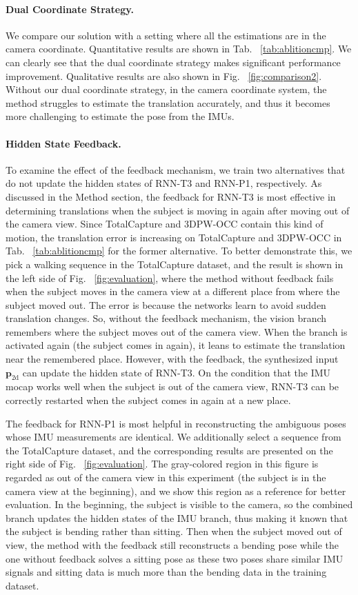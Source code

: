\documentclass[sigconf,nonacm=true]{acmart}
\begin{document}
\paragraph{Dual Coordinate Strategy.}
We compare our solution with a setting where all the estimations are in the camera coordinate.
Quantitative results are shown in Tab. ~\ref{tab:ablitioncmp}.
We can clearly see that the dual coordinate strategy makes significant performance improvement.
Qualitative results are also shown in Fig. ~\ref{fig:comparison2}.
Without our dual coordinate strategy, in the camera coordinate system, the method struggles to estimate the translation accurately, and thus it becomes more challenging to estimate the pose from the IMUs.  
\paragraph{Hidden State Feedback.}
To examine the effect of the feedback mechanism, we train two alternatives that do not update the hidden states of RNN-T3 and RNN-P1, respectively.
As discussed in the Method section, the feedback for RNN-T3 is most effective in determining translations when the subject is moving in again after moving out of the camera view.
Since TotalCapture and 3DPW-OCC contain this kind of motion, the translation error is increasing on TotalCapture and 3DPW-OCC in Tab. ~\ref{tab:ablitioncmp} for the former alternative.
To better demonstrate this, we pick a walking sequence in the TotalCapture dataset, and the result is shown in the left side of Fig. ~\ref{fig:evaluation}, where the method without feedback fails when the subject moves in the camera view at a different place from where the subject moved out.
The error is because the networks learn to avoid sudden translation changes.
So, without the feedback mechanism, the vision branch remembers where the subject moves out of the camera view. When the branch is activated again (the subject comes in again), it leans to estimate the translation near the remembered place.
However, with the feedback, the synthesized input $\boldsymbol{p}_{\mathrm{2d}}$ can update the hidden state of RNN-T3. On the condition that the IMU mocap works well when the subject is out of the camera view, RNN-T3 can be correctly restarted when the subject comes in again at a new place. 
\par
The feedback for RNN-P1 is most helpful in reconstructing the ambiguous poses whose IMU measurements are identical.
We additionally select a sequence from the TotalCapture dataset, and the corresponding results are presented on the right side of Fig. ~\ref{fig:evaluation}.
The gray-colored region in this figure is regarded as out of the camera view in this experiment (the subject is in the camera view at the beginning), and we show this region as a reference for better evaluation.
In the beginning, the subject is visible to the camera, so the combined branch updates the hidden states of the IMU branch, thus making it known that the subject is bending rather than sitting.
Then when the subject moved out of view, the method with the feedback still reconstructs a bending pose while the one without feedback solves a sitting pose as these two poses share similar IMU signals and sitting data is much more than the bending data in the training dataset.
\end{document}
